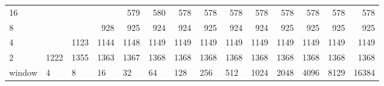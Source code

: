 \begin{table}[h]
{\begin{tabular}{l|rrrrrrrrrrrrr}
			\multicolumn{1}{|l|}{16} &  &  &  & \cellcolor[HTML]{E69900}579 & \cellcolor[HTML]{E69900}580 & \cellcolor[HTML]{E69900}578 & \cellcolor[HTML]{E69900}578 & \cellcolor[HTML]{E69900}578 & \cellcolor[HTML]{E69900}578 & \cellcolor[HTML]{E69900}578 & \cellcolor[HTML]{E69900}578 & \cellcolor[HTML]{E69900}578 & \cellcolor[HTML]{E69900}578 \\ \cline{1-1}
			\multicolumn{1}{|l|}{8} &  &  & \cellcolor[HTML]{9900E6}928 & \cellcolor[HTML]{9900E6}925 & \cellcolor[HTML]{9900E6}924 & \cellcolor[HTML]{9900E6}924 & \cellcolor[HTML]{9900E6}925 & \cellcolor[HTML]{9900E6}924 & \cellcolor[HTML]{9900E6}924 & \cellcolor[HTML]{9900E6}925 & \cellcolor[HTML]{9900E6}925 & \cellcolor[HTML]{9900E6}925 & \cellcolor[HTML]{9900E6}925 \\ \cline{1-1}
			\multicolumn{1}{|l|}{4} &  & \cellcolor[HTML]{4C00E6}1123 & \cellcolor[HTML]{4C00E6}1144 & \cellcolor[HTML]{4C00E6}1148 & \cellcolor[HTML]{4C00E6}1149 & \cellcolor[HTML]{4C00E6}1149 & \cellcolor[HTML]{4C00E6}1149 & \cellcolor[HTML]{4C00E6}1149 & \cellcolor[HTML]{4C00E6}1149 & \cellcolor[HTML]{4C00E6}1149 & \cellcolor[HTML]{4C00E6}1149 & \cellcolor[HTML]{4C00E6}1149 & \cellcolor[HTML]{4C00E6}1149 \\ \cline{1-1}
			\multicolumn{1}{|l|}{2} & \cellcolor[HTML]{4C00E6}1222 & \cellcolor[HTML]{4C00E6}1355 & \cellcolor[HTML]{4C00E6}1363 & \cellcolor[HTML]{4C00E6}1367 & \cellcolor[HTML]{4C00E6}1368 & \cellcolor[HTML]{4C00E6}1368 & \cellcolor[HTML]{4C00E6}1368 & \cellcolor[HTML]{4C00E6}1368 & \cellcolor[HTML]{4C00E6}1368 & \cellcolor[HTML]{4C00E6}1368 & \cellcolor[HTML]{4C00E6}1368 & \cellcolor[HTML]{4C00E6}1368 & \cellcolor[HTML]{4C00E6}1368 \\ \cline{1-1}
			window & \multicolumn{1}{l|}{4} & \multicolumn{1}{l|}{8} & \multicolumn{1}{l|}{16} & \multicolumn{1}{l|}{32} & \multicolumn{1}{l|}{64} & \multicolumn{1}{l|}{128} & \multicolumn{1}{l|}{256} & \multicolumn{1}{l|}{512} & \multicolumn{1}{l|}{1024} & \multicolumn{1}{l|}{2048} & \multicolumn{1}{l|}{4096} & \multicolumn{1}{l|}{8129} & \multicolumn{1}{l|}{16384} \\ \cline{2-14}
		\end{tabular}
	}
\end{table}


